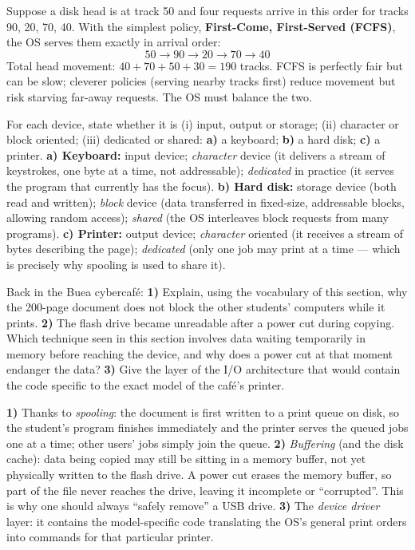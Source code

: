 \documentclass[11pt]{article}
\begin{document}
\begin{exemplebox}
Suppose a disk head is at track 50 and four requests arrive in this order for tracks 90, 20, 70, 40. With the simplest policy, \textbf{First-Come, First-Served (FCFS)}, the OS serves them exactly in arrival order:
\[ 50 \to 90 \to 20 \to 70 \to 40 \]
Total head movement: $40 + 70 + 50 + 30 = 190$ tracks. FCFS is perfectly fair but can be slow; cleverer policies (serving nearby tracks first) reduce movement but risk starving far-away requests. The OS must balance the two.
\end{exemplebox}

\begin{exoresolu}
For each device, state whether it is (i) input, output or storage; (ii) character or block oriented; (iii) dedicated or shared: \textbf{a)} a keyboard; \textbf{b)} a hard disk; \textbf{c)} a printer.
\tcblower
\textbf{a) Keyboard:} input device; \emph{character} device (it delivers a stream of keystrokes, one byte at a time, not addressable); \emph{dedicated} in practice (it serves the program that currently has the focus).
\textbf{b) Hard disk:} storage device (both read and written); \emph{block} device (data transferred in fixed-size, addressable blocks, allowing random access); \emph{shared} (the OS interleaves block requests from many programs).
\textbf{c) Printer:} output device; \emph{character} oriented (it receives a stream of bytes describing the page); \emph{dedicated} (only one job may print at a time --- which is precisely why spooling is used to share it).
\end{exoresolu}

\begin{exercice}
Back in the Buea cybercafé: \textbf{1)} Explain, using the vocabulary of this section, why the 200-page document does not block the other students' computers while it prints. \textbf{2)} The flash drive became unreadable after a power cut during copying. Which technique seen in this section involves data waiting temporarily in memory before reaching the device, and why does a power cut at that moment endanger the data? \textbf{3)} Give the layer of the I/O architecture that would contain the code specific to the exact model of the café's printer.
\end{exercice}

\begin{corrige}[Exercise 1]
\textbf{1)} Thanks to \emph{spooling}: the document is first written to a print queue on disk, so the student's program finishes immediately and the printer serves the queued jobs one at a time; other users' jobs simply join the queue.
\textbf{2)} \emph{Buffering} (and the disk cache): data being copied may still be sitting in a memory buffer, not yet physically written to the flash drive. A power cut erases the memory buffer, so part of the file never reaches the drive, leaving it incomplete or ``corrupted''. This is why one should always ``safely remove'' a USB drive.
\textbf{3)} The \emph{device driver} layer: it contains the model-specific code translating the OS's general print orders into commands for that particular printer.
\end{corrige}
\end{document}
